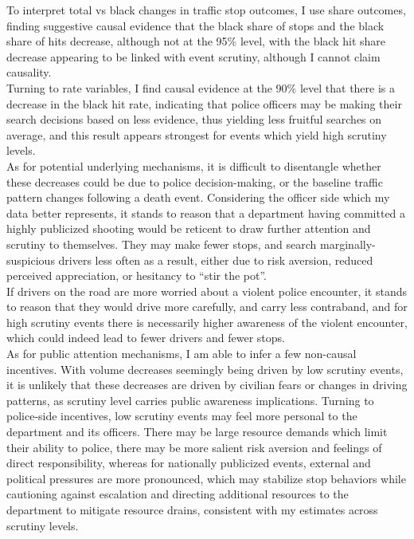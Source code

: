 \documentclass[12pt,a4paper]{article}
\begin{document}
To interpret total vs black changes in traffic stop outcomes, I use share outcomes, finding suggestive causal evidence that the black share of stops and the black share of hits decrease, although not at the 95\% level, with the black hit share decrease appearing to be linked with event scrutiny, although I cannot claim causality. \\

Turning to rate variables, I find causal evidence at the 90\% level that there is a decrease in the black hit rate, indicating that police officers may be making their search decisions based on less evidence, thus yielding less fruitful searches on average, and this result appears strongest for events which yield high scrutiny levels. \\

As for potential underlying mechanisms, it is difficult to disentangle whether these decreases could be due to police decision-making, or the baseline traffic pattern changes following a death event. Considering the officer side which my data better represents, it stands to reason that a department having committed a highly publicized shooting would be reticent to draw further attention and scrutiny to themselves. They may make fewer stops, and search marginally-suspicious drivers less often as a result, either due to risk aversion, reduced perceived appreciation, or hesitancy to ``stir the pot''. \\

If drivers on the road are more worried about a violent police encounter, it stands to reason that they would drive more carefully, and carry less contraband, and for high scrutiny events there is necessarily higher awareness of the violent encounter, which could indeed lead to fewer drivers and fewer stops. \\

As for public attention mechanisms, I am able to infer a few non-causal incentives. With volume decreases seemingly being driven by low scrutiny events, it is unlikely that these decreases are driven by civilian fears or changes in driving patterns, as scrutiny level carries public awareness implications. Turning to police-side incentives, low scrutiny events may feel more personal to the department and its officers. There may be large resource demands which limit their ability to police, there may be more salient risk aversion and feelings of direct responsibility, whereas for nationally publicized events, external and political pressures are more pronounced, which may stabilize stop behaviors while cautioning against escalation and directing additional resources to the department to mitigate resource drains, consistent with my estimates across scrutiny levels. \\
\end{document}
